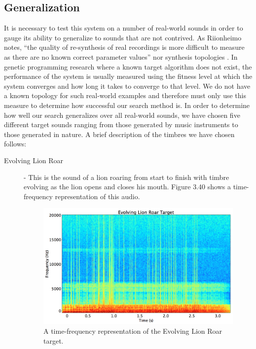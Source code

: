 \documentclass[a4paper,12pt]{report} 	%
\numberwithin{figure}{chapter}
\numberwithin{table}{chapter}
\numberwithin{equation}{chapter}
\begin{document}
\begin{flushleft}
\subsection{Generalization}
It is necessary to test this system on a number of real-world sounds in order to gauge its ability to generalize to sounds that are not contrived. As Riionheimo notes, ``the quality of re-synthesis of real recordings is more difficult to measure as there are no known correct parameter values'' nor synthesis topologies \cite[p. 13]{Riionheimo:2003qo}. In genetic programming research where a known target algorithm does not exist, the performance of the system is usually measured using the fitness level at which the system converges and how long it takes to converge to that level. We do not have a known topology for such real-world examples and therefore must only use this measure to determine how successful our search method is. In order to determine how well our search generalizes over all real-world sounds, we have chosen five different target sounds ranging from those generated by music instruments to those generated in nature. A brief description of the timbres we have chosen follows:
\begin{description}
\item[Evolving Lion Roar] - This is the sound of a lion roaring from start to finish with timbre evolving as the lion opens and closes his mouth. Figure 3.40 shows a time-frequency representation of this audio.
\begin{figure}[h!]
\begin{center}
\includegraphics[scale=0.35,width=\linewidth]{EvolvingLionRoarTargetSTFT}
\caption[Evolving Lion Roar Time-Frequency Representation]{A time-frequency representation of the Evolving Lion Roar target.}
\end{center}

\end{figure}
\end{description}
\end{flushleft}
\end{document}
